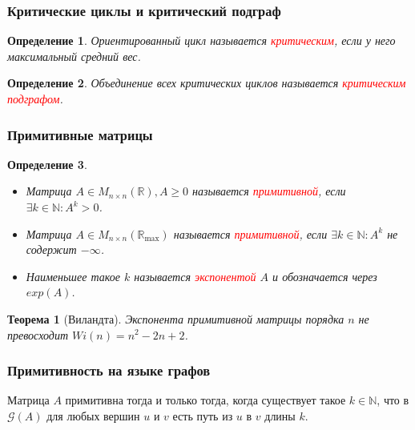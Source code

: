 \documentclass{beamer}
\newtheorem*{Th}{Теорема}
\newtheorem*{Def}{Определение}
\newcommand{\cred}[1]{\textcolor{red}{#1}}
\begin{document}
\begin{frame}
\frametitle{Критические циклы и критический подграф}
\begin{Def}
	Ориентированный цикл называется \cred{критическим}, если у него максимальный средний вес.
\end{Def}

\begin{Def}
	Объединение всех критических циклов называется \cred{критическим подграфом}.
\end{Def}

 
\end{frame}


\begin{frame}
\frametitle{Примитивные матрицы} 
\begin{Def}
\begin{itemize}
	\item Матрица $A \in M_{n\times n}(\mathbb{R}), A \ge 0$ называется \cred{примитивной}, если $\exists k \in \mathbb{N}: A^k > 0$.
	\item Матрица $A \in M_{n\times n}(\mathbb{R}_{\max})$ называется 				\cred{примитивной}, если $\exists k \in \mathbb{N}: A^k$ не содержит $-\infty$.
	\item Наименьшее такое $k$ называется \cred{экспонентой} $A$ и обозначается через $exp(A)$.
\end{itemize}
\end{Def}

\begin{Th}[Виландта]
	Экспонента примитивной матрицы порядка $n$ не превосходит $Wi(n) = n^2 -2n + 2$.
\end{Th}
\end{frame}


\begin{frame}
\frametitle{Примитивность на языке графов} 
Матрица $A$ примитивна тогда и только тогда, когда существует такое $k \in \mathbb{N}$, что в $\mathcal{G}(A)$ для любых вершин $u$ и $v$ есть путь из $u$ в $v$ длины $k$.
\end{frame}

\end{document}
